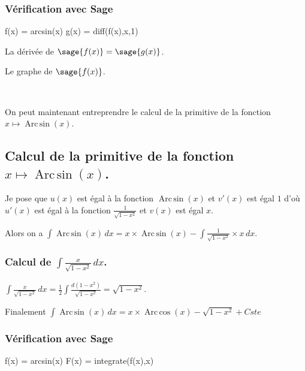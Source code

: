 \documentclass[a4paper,14pt]{extreport} %
\renewcommand{\arcsin}{\mathop{\mathrm{Arc\,sin}}}
\renewcommand{\arccos}{\mathop{\mathrm{Arc\,cos}}}
\begin{document}
\subsubsection{Vérification avec Sage}

\begin{sageblock}
    f(x) = arcsin(x)
    g(x) = diff(f(x),x,1)
\end{sageblock}

La dérivée de $\sage{f(x)} = \sage{g(x)} $.


Le graphe de $\sage{f(x)} $.


\begin{center}
 \\
\end{center}




On peut maintenant entreprendre le calcul de la primitive de la  fonction  $x \mapsto \arcsin(x) $.





\subsection{Calcul de la primitive de la fonction  $x \mapsto \arcsin(x) $.}




Je pose que $u(x)$  est égal à la fonction $\arcsin(x)$ et $v'(x)$ est égal $1$  d'où $u'(x)$  est égal à la fonction $ \frac{1}{\sqrt{1- x^2}} $ et $v(x)$ est égal $x$.

Alors on a $\int \arcsin(x) \, dx = x \times \arcsin(x) -\int \frac{1}{\sqrt{1- x^2}} \times x \, dx $.


\subsubsection{Calcul de $\int \frac{x}{\sqrt{1- x^2}} \, dx $.}

$\int \frac{x}{\sqrt{1- x^2}} \, dx = \frac{1}{2} \int \frac{d(1-x^2)}{\sqrt{1- x^2}}= \sqrt{1- x^2} $.


Finalement $\int \arcsin(x) \, dx = x \times \arccos(x) - \sqrt{1- x^2} + Cste $

\subsubsection{Vérification avec Sage}

\begin{sageblock}
    f(x) = arcsin(x)
    F(x) = integrate(f(x),x)
\end{sageblock}
\end{document}
